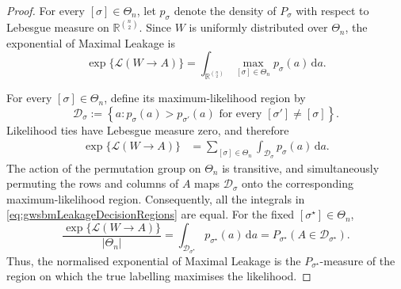 \documentclass[10pt,a4paper]{amsart}
\newcommand{\ml}[2]{\mathcal{L}(#1\!\to\!#2)}
\begin{document}
\begin{proof}
For every $[\sigma]\in\Theta_n$, let $p_\sigma$ denote the density of
$P_\sigma$ with respect to Lebesgue measure on
$\mathbb R^{\binom{n}{2}}$. Since $W$ is uniformly distributed over
$\Theta_n$, the exponential of Maximal Leakage is
\begin{equation}
\exp\{\ml{W}{A}\}
=
\int_{\mathbb R^{\binom{n}{2}}}
\max_{[\sigma]\in\Theta_n}
p_\sigma(a)
\,\mathrm da.
\label{eq:gwsbmLeakageIntegral}
\end{equation}

For every $[\sigma]\in\Theta_n$, define its maximum-likelihood region by
\begin{equation}
\mathcal D_\sigma
:=
\left\{
a:
p_\sigma(a)>
p_{\sigma'}(a)
\text{ for every }
[\sigma']\neq[\sigma]
\right\}.
\label{eq:gwsbmMLRegion}
\end{equation}
Likelihood ties have Lebesgue measure zero, and therefore
\begin{align}
\exp\{\ml{W}{A}\}
&=
\sum_{[\sigma]\in\Theta_n}
\int_{\mathcal D_\sigma}
p_\sigma(a)
\,\mathrm da.
\label{eq:gwsbmLeakageDecisionRegions}
\end{align}
The action of the permutation group on $\Theta_n$ is transitive, and
simultaneously permuting the rows and columns of $A$ maps
$\mathcal D_\sigma$ onto the corresponding maximum-likelihood region.
Consequently, all the integrals in
\eqref{eq:gwsbmLeakageDecisionRegions} are equal. For the fixed
$[\sigma^\star]\in\Theta_n$,
\begin{equation}
\frac{\exp\{\ml{W}{A}\}}{|\Theta_n|}
=
\int_{\mathcal D_{\sigma^\star}}
p_{\sigma^\star}(a)
\,\mathrm da
=
P_{\sigma^\star}
\left(
A\in\mathcal D_{\sigma^\star}
\right).
\label{eq:gwsbmNormalisedLeakageRegion}
\end{equation}
Thus, the normalised exponential of Maximal Leakage is the
$P_{\sigma^\star}$-measure of the region on which the true labelling
maximises the likelihood.


\end{proof}
\end{document}
